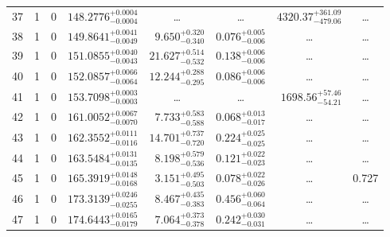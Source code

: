 \begin{table*}[!]
\begin{tabular}{llcrrlrc}
37 & 1 & 0 & $    148.2776_{-      0.0004}^{+      0.0004}$ & \multicolumn{1}{c}{\dots} & \multicolumn{1}{c}{\dots} & $     4320.37_{-      479.06}^{+      361.09}$ & \dots \\[1pt]
38 & 1 & 0 & $    149.8641_{-      0.0049}^{+      0.0041}$ & $       9.650_{-       0.340}^{+       0.320}$ & $       0.076_{-       0.006}^{+       0.005}$ & \multicolumn{1}{c}{\dots} & \dots \\[1pt]
39 & 1 & 0 & $    151.0855_{-      0.0043}^{+      0.0040}$ & $      21.627_{-       0.532}^{+       0.514}$ & $       0.138_{-       0.006}^{+       0.006}$ & \multicolumn{1}{c}{\dots} & \dots \\[1pt]
40 & 1 & 0 & $    152.0857_{-      0.0064}^{+      0.0066}$ & $      12.244_{-       0.295}^{+       0.288}$ & $       0.086_{-       0.006}^{+       0.006}$ & \multicolumn{1}{c}{\dots} & \dots \\[1pt]
41 & 1 & 0 & $    153.7098_{-      0.0003}^{+      0.0003}$ & \multicolumn{1}{c}{\dots} & \multicolumn{1}{c}{\dots} & $     1698.56_{-       54.21}^{+       57.46}$ & \dots \\[1pt]

42 & 1 & 0 & $    161.0052_{-      0.0070}^{+      0.0067}$ & $       7.733_{-       0.588}^{+       0.583}$ & $       0.068_{-       0.017}^{+       0.013}$ & \multicolumn{1}{c}{\dots} & \dots \\[1pt]
43 & 1 & 0 & $    162.3552_{-      0.0116}^{+      0.0111}$ & $      14.701_{-       0.720}^{+       0.737}$ & $       0.224_{-       0.025}^{+       0.025}$ & \multicolumn{1}{c}{\dots} & \dots \\[1pt]
44 & 1 & 0 & $    163.5484_{-      0.0135}^{+      0.0131}$ & $       8.198_{-       0.536}^{+       0.579}$ & $       0.121_{-       0.023}^{+       0.022}$ & \multicolumn{1}{c}{\dots} & \dots \\[1pt]
45 & 1 & 0 & $    165.3919_{-      0.0168}^{+      0.0148}$ & $       3.151_{-       0.503}^{+       0.495}$ & $       0.078_{-       0.026}^{+       0.022}$ & \multicolumn{1}{c}{\dots} & 0.727 \\[1pt]

46 & 1 & 0 & $    173.3139_{-      0.0255}^{+      0.0246}$ & $       8.467_{-       0.383}^{+       0.435}$ & $       0.456_{-       0.064}^{+       0.060}$ & \multicolumn{1}{c}{\dots} & \dots \\[1pt]
47 & 1 & 0 & $    174.6443_{-      0.0179}^{+      0.0165}$ & $       7.064_{-       0.378}^{+       0.373}$ & $       0.242_{-       0.031}^{+       0.030}$ & \multicolumn{1}{c}{\dots} & \dots \\[1pt]



\hline
\end{tabular}
\end{table*}


